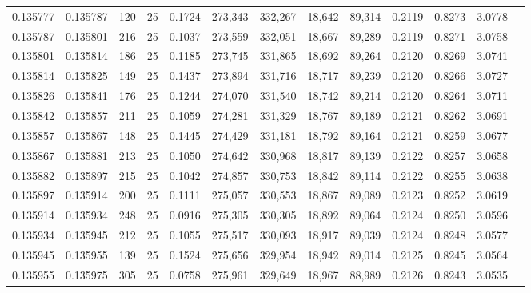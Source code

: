 \begin{tabular}{rrrrrrrrrrrrr}
0.135777 & 0.135787 &   120 &  25 &                                     0.1724 & 273,343 & 332,267 &  18,642 &  89,314 & 0.2119 & 0.8273 & 3.0778 \\
0.135787 & 0.135801 &   216 &  25 &                                     0.1037 & 273,559 & 332,051 &  18,667 &  89,289 & 0.2119 & 0.8271 & 3.0758 \\
0.135801 & 0.135814 &   186 &  25 &                                     0.1185 & 273,745 & 331,865 &  18,692 &  89,264 & 0.2120 & 0.8269 & 3.0741 \\
0.135814 & 0.135825 &   149 &  25 &                                     0.1437 & 273,894 & 331,716 &  18,717 &  89,239 & 0.2120 & 0.8266 & 3.0727 \\
0.135826 & 0.135841 &   176 &  25 &                                     0.1244 & 274,070 & 331,540 &  18,742 &  89,214 & 0.2120 & 0.8264 & 3.0711 \\
0.135842 & 0.135857 &   211 &  25 &                                     0.1059 & 274,281 & 331,329 &  18,767 &  89,189 & 0.2121 & 0.8262 & 3.0691 \\
0.135857 & 0.135867 &   148 &  25 &                                     0.1445 & 274,429 & 331,181 &  18,792 &  89,164 & 0.2121 & 0.8259 & 3.0677 \\
0.135867 & 0.135881 &   213 &  25 &                                     0.1050 & 274,642 & 330,968 &  18,817 &  89,139 & 0.2122 & 0.8257 & 3.0658 \\
0.135882 & 0.135897 &   215 &  25 &                                     0.1042 & 274,857 & 330,753 &  18,842 &  89,114 & 0.2122 & 0.8255 & 3.0638 \\
0.135897 & 0.135914 &   200 &  25 &                                     0.1111 & 275,057 & 330,553 &  18,867 &  89,089 & 0.2123 & 0.8252 & 3.0619 \\
0.135914 & 0.135934 &   248 &  25 &                                     0.0916 & 275,305 & 330,305 &  18,892 &  89,064 & 0.2124 & 0.8250 & 3.0596 \\
0.135934 & 0.135945 &   212 &  25 &                                     0.1055 & 275,517 & 330,093 &  18,917 &  89,039 & 0.2124 & 0.8248 & 3.0577 \\
0.135945 & 0.135955 &   139 &  25 &                                     0.1524 & 275,656 & 329,954 &  18,942 &  89,014 & 0.2125 & 0.8245 & 3.0564 \\
0.135955 & 0.135975 &   305 &  25 &                                     0.0758 & 275,961 & 329,649 &  18,967 &  88,989 & 0.2126 & 0.8243 & 3.0535 \\

\end{tabular}
